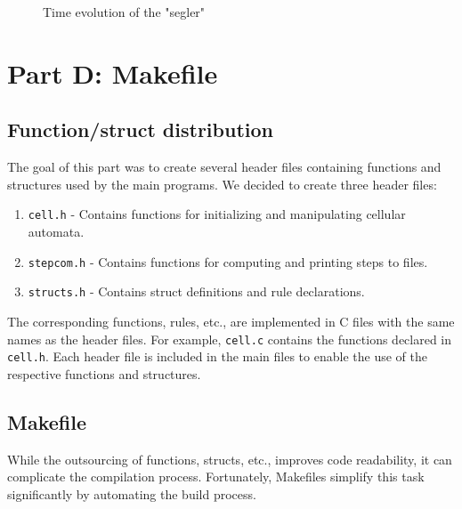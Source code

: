 \documentclass[12pt,a4paper]{article}
\begin{document}
\begin{figure}[H]
\begin{minipage}[b]{0.35\textwidth}
        \caption*{\small $t=150$}
    \end{minipage}
    \caption{\small Time evolution of the "segler"}
    \label{fig:time_evolution_square}
\end{figure}


\newpage


\section{Part D: Makefile}
\vspace{1cm}


\subsection{Function/struct distribution}
The goal of this part was to create several header files containing functions and structures used by the main programs.
\newline
We decided to create three header files:
\begin{enumerate}[label=\roman*.]
    \item \texttt{cell.h} - Contains functions for initializing and manipulating cellular automata.
    \item \texttt{stepcom.h} - Contains functions for computing and printing steps to files.
    \item \texttt{structs.h} - Contains struct definitions and rule declarations.
\end{enumerate}
The corresponding functions, rules, etc., are implemented in C files with the same names as the header files. 
For example, \texttt{cell.c} contains the functions declared in \texttt{cell.h}. Each header file is included in the main files 
to enable the use of the respective functions and structures.

\vspace{1cm}

\subsection{Makefile}
While the outsourcing of functions, structs, etc., improves code readability, it can complicate the compilation process. 
Fortunately, Makefiles simplify this task significantly by automating the build process.
\newline
\end{document}
